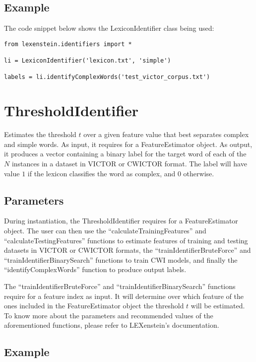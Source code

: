 \subsection{Example}

The code snippet below shows the LexiconIdentifier class being used:

\begin{lstlisting}
from lexenstein.identifiers import *

li = LexiconIdentifier('lexicon.txt', 'simple')

labels = li.identifyComplexWords('test_victor_corpus.txt')
\end{lstlisting}



\section{ThresholdIdentifier}

Estimates the threshold $t$ over a given feature value that best separates complex and simple words. As input, it requires for a FeatureEstimator object. As output, it produces a vector containing a binary label for the target word of each of the $N$ instances in a dataset in VICTOR or CWICTOR format. The label will have value $1$ if the lexicon classifies the word as complex, and $0$ otherwise.

\subsection{Parameters}

During instantiation, the ThresholdIdentifier requires for a FeatureEstimator object. The user can then use the ``calculateTrainingFeatures'' and ``calculateTestingFeatures'' functions to estimate features of training and testing datasets in VICTOR or CWICTOR formats, the ``trainIdentifierBruteForce'' and ``trainIdentifierBinarySearch'' functions to train CWI models, and finally the ``identifyComplexWords'' function to produce output labels.

The ``trainIdentifierBruteForce'' and ``trainIdentifierBinarySearch'' functions require for a feature index as input. It will determine over which feature of the ones included in the FeatureEstimator object the threshold $t$ will be estimated. To know more about the parameters and recommended values of the aforementioned functions, please refer to LEXenstein's documentation.

\subsection{Example}

